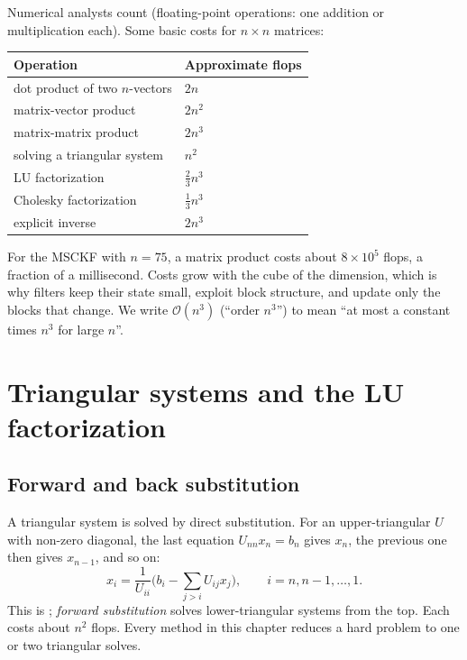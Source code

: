 Numerical analysts count  (floating-point operations: one addition or multiplication each). Some basic costs
for $n\times n$ matrices:
\begin{center}\small
\begin{tabular}{@{}l l@{}}
\toprule
Operation & Approximate flops \\
\midrule
dot product of two $n$-vectors & $2n$ \\
matrix-vector product & $2n^2$ \\
matrix-matrix product & $2n^3$ \\
solving a triangular system & $n^2$ \\
LU factorization & $\tfrac23n^3$ \\
Cholesky factorization & $\tfrac13n^3$ \\
explicit inverse & $2n^3$ \\
\bottomrule
\end{tabular}
\end{center}
For the MSCKF with $n = 75$, a matrix product costs about $8\times10^5$ flops, a fraction of a millisecond. Costs grow with the cube of
the dimension, which is why filters keep their state small, exploit block structure, and update only the blocks that change.
We write $\mathcal{O}(n^3)$ (``order $n^3$'') to mean ``at most a constant times $n^3$ for large $n$''.

\section{Triangular systems and the LU factorization}

\subsection{Forward and back substitution}

A triangular system is solved by direct substitution. For an upper-triangular $U$ with non-zero diagonal, the last equation
$U_{nn}x_n = b_n$ gives $x_n$, the previous one then gives $x_{n-1}$, and so on:
\begin{equation}
  x_i = \frac{1}{U_{ii}}\Big(b_i - \sum_{j>i}U_{ij}x_j\Big), \qquad i = n, n-1, \dots, 1 .
\end{equation}
This is ; \emph{forward substitution} solves lower-triangular systems from the top. Each costs about $n^2$
flops. Every method in this chapter reduces a hard problem to one or two triangular solves.


